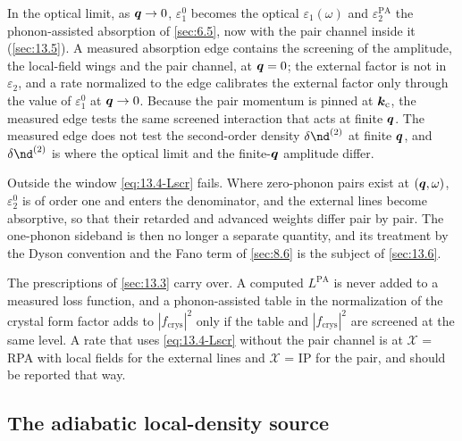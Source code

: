 In the optical limit, as $\bm{q} \to 0$, $\varepsilon_1^0$ becomes the optical $\varepsilon_1(\omega)$ and $\varepsilon_2^{\mathrm{PA}}$ the phonon-assisted absorption of \cref{sec:6.5}, now with the pair channel inside it (\cref{sec:13.5}). A measured absorption edge contains the screening of the amplitude, the local-field wings and the pair channel, at $\bm{q} = 0$; the external factor is not in $\varepsilon_2$, and a rate normalized to the edge calibrates the external factor only through the value of $\varepsilon_1^0$ at $\bm{q} \to 0$. Because the pair momentum is pinned at $\bm{k}_{\mathrm{c}}$, the measured edge tests the same screened interaction that acts at finite $\bm{q}$. The measured edge does not test the second-order density $\delta\nd^{(2)}$ at finite $\bm{q}$, and $\delta\nd^{(2)}$ is where the optical limit and the finite-$\bm{q}$ amplitude differ.

Outside the window \cref{eq:13.4-Lscr} fails. Where zero-phonon pairs exist at $(\bm{q},\omega)$, $\varepsilon_2^0$ is of order one and enters the denominator, and the external lines become absorptive, so that their retarded and advanced weights differ pair by pair. The one-phonon sideband is then no longer a separate quantity, and its treatment by the Dyson convention and the Fano term of \cref{sec:8.6} is the subject of \cref{sec:13.6}.

The prescriptions of \cref{sec:13.3} carry over. A computed $L^{\mathrm{PA}}$ is never added to a measured loss function, and a phonon-assisted table in the normalization of the crystal form factor adds to $|f_{\mathrm{crys}}|^2$ only if the table and $|f_{\mathrm{crys}}|^2$ are screened at the same level. A rate that uses \cref{eq:13.4-Lscr} without the pair channel is at $\mathcal{X}$ = RPA with local fields for the external lines and $\mathcal{X}$ = IP for the pair, and should be reported that way.

\subsection{The adiabatic local-density source}

